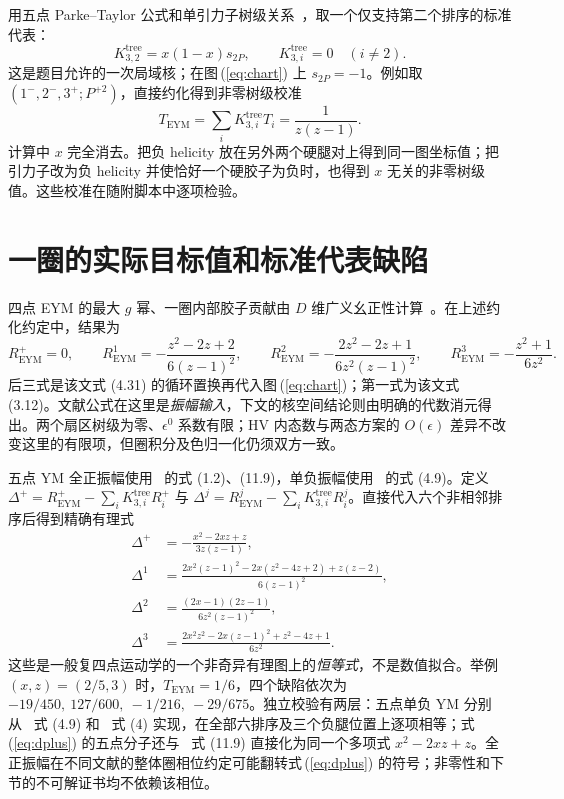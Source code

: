 \documentclass[UTF8,11pt,a4paper]{ctexart}
\newcommand{\EYM}{\mathrm{EYM}}
\begin{document}
用五点 Parke--Taylor 公式和单引力子树级关系~\cite{ref:st}，取一个仅支持第二个排序的标准代表：
\begin{equation}
 K^{\mathrm{tree}}_{3,2}=x(1-x)s_{2P},\qquad
 K^{\mathrm{tree}}_{3,i}=0\quad(i\ne2).
\label{eq:ktree}
\end{equation}
这是题目允许的一次局域核；在图\,(\ref{eq:chart}) 上 $s_{2P}=-1$。例如取 $(1^-,2^-,3^+;P^{+2})$，直接约化得到非零树级校准
\begin{equation}
 T_{\EYM}=\sum_i K^{\mathrm{tree}}_{3,i}T_i
 =\frac{1}{z(z-1)}.
\label{eq:treecal}
\end{equation}
计算中 $x$ 完全消去。把负 helicity 放在另外两个硬腿对上得到同一图坐标值；把引力子改为负 helicity 并使恰好一个硬胶子为负时，也得到 $x$ 无关的非零树级值。这些校准在随附脚本中逐项检验。

\section{一圈的实际目标值和标准代表缺陷}

四点 EYM 的最大 $g$ 幂、一圈内部胶子贡献由 $D$ 维广义幺正性计算~\cite{ref:npt}。在上述约化约定中，结果为
\begin{equation}
 R^+_{\EYM}=0,\qquad
 R^1_{\EYM}=-\frac{z^2-2z+2}{6(z-1)^2},\qquad
 R^2_{\EYM}=-\frac{2z^2-2z+1}{6z^2(z-1)^2},\qquad
 R^3_{\EYM}=-\frac{z^2+1}{6z^2}.
\label{eq:targets}
\end{equation}
后三式是该文式 (4.31) 的循环置换再代入图\,(\ref{eq:chart})；第一式为该文式 (3.12)。文献公式在这里是\emph{振幅输入}，下文的核空间结论则由明确的代数消元得出。两个扇区树级为零、$\epsilon^0$ 系数有限；HV 内态数与两态方案的 $O(\epsilon)$ 差异不改变这里的有限项，但圈积分及色归一化仍须双方一致。

五点 YM 全正振幅使用~\cite{ref:npt} 的式 (1.2)、(11.9)，单负振幅使用~\cite{ref:bdk05} 的式 (4.9)。定义 $\Delta^+=R^+_{\EYM}-\sum_iK^{\mathrm{tree}}_{3,i}R^+_i$ 与 $\Delta^j=R^j_{\EYM}-\sum_iK^{\mathrm{tree}}_{3,i}R^j_i$。直接代入六个非相邻排序后得到精确有理式
\begin{align}
\Delta^+ &=-\frac{x^2-2xz+z}{3z(z-1)},\label{eq:dplus}\\
\Delta^1 &=\frac{2x^2(z-1)^2-2x(z^2-4z+2)+z(z-2)}{6(z-1)^2},\label{eq:d1}\\
\Delta^2 &=\frac{(2x-1)(2z-1)}{6z^2(z-1)^2},\label{eq:d2}\\
\Delta^3 &=\frac{2x^2z^2-2x(z-1)^2+z^2-4z+1}{6z^2}.\label{eq:d3}
\end{align}
这些是一般复四点运动学的一个非奇异有理图上的\emph{恒等式}，不是数值拟合。举例 $(x,z)=(2/5,3)$ 时，$T_{\EYM}=1/6$，四个缺陷依次为 $-19/450,\ 127/600,\ -1/216,\ -29/675$。独立校验有两层：五点单负 YM 分别从~\cite{ref:bdk05} 式 (4.9) 和~\cite{ref:bdk93} 式 (4) 实现，在全部六排序及三个负腿位置上逐项相等；式\,(\ref{eq:dplus}) 的五点分子还与~\cite{ref:npt} 式 (11.9) 直接化为同一个多项式 $x^2-2xz+z$。全正振幅在不同文献的整体圈相位约定可能翻转式\,(\ref{eq:dplus}) 的符号；非零性和下节的不可解证书均不依赖该相位。
\end{document}
